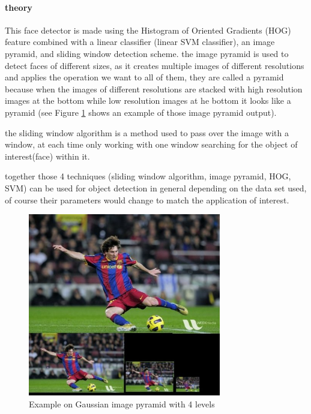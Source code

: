 \paragraph{theory}
This face detector is made using the Histogram of Oriented Gradients (HOG) feature combined with a linear classifier (linear SVM classifier), an image pyramid, and sliding window detection scheme.
the image pyramid is used to detect faces of different sizes, as it creates multiple images of different resolutions and applies the operation we want to all of them, they are called a pyramid because when the images of different resolutions are stacked with high resolution images at the bottom while low resolution images at he bottom it looks like a pyramid (see Figure \ref{fig:gaussian_pyramid} shows an example of those image pyramid output).
\newline

the sliding window algorithm is a method used to pass over the image with a window, at each time only working with one window searching for the object of interest(face) within it.

together those 4 techniques (sliding window algorithm, image pyramid, HOG, SVM) can be used for object detection in general depending on the data set used, of course their parameters would change to match the application of interest.

\begin{figure}
	\centering
	\includegraphics[width=0.75\textwidth]{images/gaussian_pyramid.jpg}
	\caption{Example on Gaussian image pyramid with 4 levels}
	\label{fig:gaussian_pyramid}
\end{figure}

